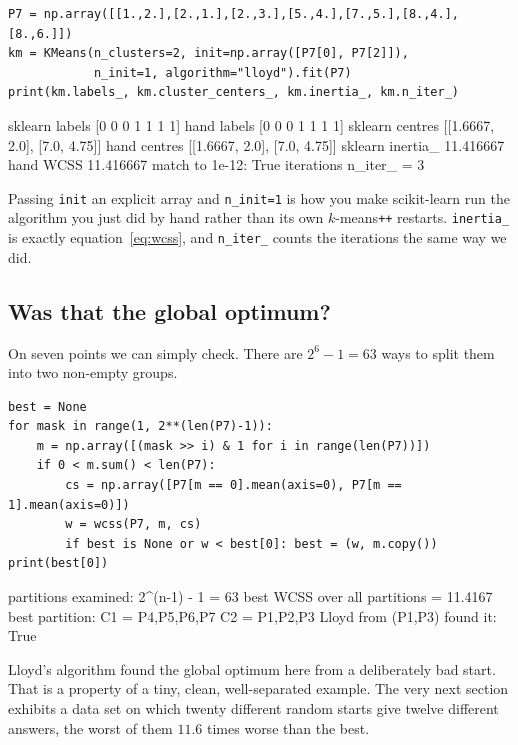 \documentclass[11pt]{article}
\begin{document}
\begin{lstlisting}
P7 = np.array([[1.,2.],[2.,1.],[2.,3.],[5.,4.],[7.,5.],[8.,4.],[8.,6.]])
km = KMeans(n_clusters=2, init=np.array([P7[0], P7[2]]),
            n_init=1, algorithm="lloyd").fit(P7)
print(km.labels_, km.cluster_centers_, km.inertia_, km.n_iter_)
\end{lstlisting}
\begin{codeout}
sklearn labels    [0 0 0 1 1 1 1]
hand labels       [0 0 0 1 1 1 1]
sklearn centres   [[1.6667, 2.0], [7.0, 4.75]]
hand centres      [[1.6667, 2.0], [7.0, 4.75]]
sklearn inertia_ 11.416667
hand WCSS        11.416667
match to 1e-12:   True
iterations n_iter_ = 3
\end{codeout}

Passing \texttt{init} an explicit array and \texttt{n\_init=1} is how you make
scikit-learn run the algorithm you just did by hand rather than its own
$k$-means\texttt{++} restarts. \texttt{inertia\_} is exactly
equation~\eqref{eq:wcss}, and \texttt{n\_iter\_} counts the iterations the
same way we did.

\subsection{Was that the global optimum?}

On seven points we can simply check. There are $2^{6} - 1 = 63$ ways to split
them into two non-empty groups.

\begin{lstlisting}
best = None
for mask in range(1, 2**(len(P7)-1)):
    m = np.array([(mask >> i) & 1 for i in range(len(P7))])
    if 0 < m.sum() < len(P7):
        cs = np.array([P7[m == 0].mean(axis=0), P7[m == 1].mean(axis=0)])
        w = wcss(P7, m, cs)
        if best is None or w < best[0]: best = (w, m.copy())
print(best[0])
\end{lstlisting}
\begin{codeout}
partitions examined: 2^(n-1) - 1 = 63
best WCSS over all partitions = 11.4167
best partition: C1 = {P4,P5,P6,P7}  C2 = {P1,P2,P3}
Lloyd from (P1,P3) found it: True
\end{codeout}

\begin{caution}
Lloyd's algorithm found the global optimum here from a deliberately bad
start. That is a property of a tiny, clean, well-separated example. The very
next section exhibits a data set on which twenty different random starts give
twelve different answers, the worst of them $11.6$ times worse than the best.
\end{caution}
\end{document}
